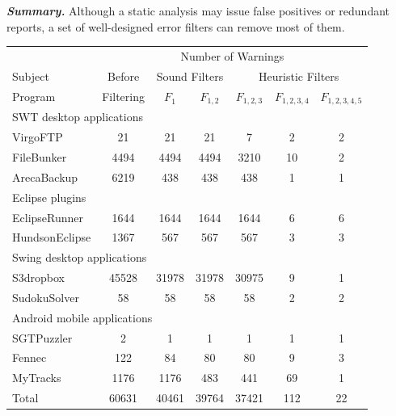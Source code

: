 \vspace{1mm}

\noindent \textbf{\textit{Summary.}} Although a static analysis may
issue false positives or redundant reports, a set of well-designed
error filters can remove most of them.

\begin{table}[t]
\begin{center}
 \fontsize{9pt}{\baselineskip}\selectfont
\setlength{\tabcolsep}{.40\tabcolsep}
\hspace*{-0.2cm}
\begin{tabular}{|l||c|c|c|c|c|c|}
\hline
 & \multicolumn{6}{|c|}{Number of Warnings}  \\
\cline{2-7}
 Subject & Before & \multicolumn{2}{|c|}{Sound Filters}  &  \multicolumn{3}{|c|}{Heuristic Filters}  \\
\cline{3-7}
 Program &Filtering  & $F_1$ & $F_{1,2}$ & $F_{1,2,3}$&$F_{1,2,3,4}$ & $F_{1,2,3,4,5}$\\
\hline \hline
\multicolumn{7}{|l|}{SWT desktop applications}   \\
 \hline
 VirgoFTP &  21 &  21 &  21 & 7 &  2 & 2\\
 \hline
 FileBunker &  4494 &  4494 &  4494 &  3210 &  10  & 2\\
 \hline
 ArecaBackup &  6219 &  438 & 438 &  438  &  1 & 1\\
 \hline
 \hline
\multicolumn{7}{|l|}{Eclipse plugins}   \\
 \hline
 EclipseRunner&  1644 &  1644 &  1644 & 1644 &  6 & 6\\
 \hline
 HundsonEclipse&  1367 &  567 &  567 & 567 &  3 & 3\\
 \hline
 \hline
\multicolumn{7}{|l|}{Swing desktop applications}   \\
 \hline
 S3dropbox&  45528 &  31978 &  31978 & 30975 &  9 & 1\\
 \hline
 SudokuSolver &  58 &  58 &  58 & 58  &  2 & 2\\
 \hline
 \hline
\multicolumn{7}{|l|}{Android mobile applications}   \\
 \hline
 SGTPuzzler&  2 &  1 &  1 & 1 &  1 & 1\\
 \hline
 Fennec &  122 &  84 & 80 & 80 &  9 & 3\\
 \hline
 MyTracks &  1176 &  1176 &  483 & 441 &  69 & 1 \\
\hline
 \hline
 Total &  60631 &  40461 &  39764 &  37421 &  112 & 22 \\

\end{tabular}
\end{center}
\end{table}
